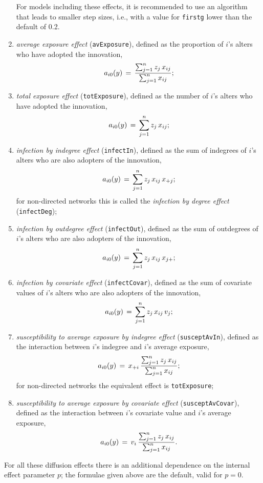 \documentclass[a4paper,fleqn,11pt]{article}
\newcommand{\+}{\, + \,}
\newcommand{\vit}{\theenumi}
\begin{document}
\begin{enumerate}
 For models including these effects, it is recommended to use
 an algorithm that leads to smaller step sizes, i.e.,
 with a value for \texttt{firstg} lower than the default of 0.2.

\item \emph{average exposure effect} (\verb|avExposure|),
  defined as the proportion of $i$'s alters who have adopted the innovation,
\[
a_{i\vit}(y) \, = \, \frac{\sum_{j=1}^n z_j\, x_{ij} }{\sum_{j=1}^n x_{ij}};
\]

\item \emph{total exposure effect} (\verb|totExposure|), defined as the
 number of $i$'s alters who have adopted the innovation,
\[
a_{i\vit}(y) \,=\, \sum_{j=1}^n z_j\, x_{ij} ;
\]
\item \emph{infection by indegree effect} (\verb|infectIn|),
  defined as the sum of indegrees of $i$'s alters who are also adopters of the innovation,
\[
a_{i\vit}(y) \, =\, \sum_{j=1}^n z_j \,x_{ij}\, x_{+j};
\]
  for non-directed networks this is called the
   \emph{infection by degree effect} (\verb|infectDeg|);
\item \emph{infection by outdegree effect} (\verb|infectOut|),
 defined as the sum of outdegrees of $i$'s alters who are also adopters of the innovation,
\[
a_{i\vit}(y)\, = \, \sum_{j=1}^n z_j\, x_{ij}\, x_{j+};
\]
\item \emph{infection by covariate effect} (\verb|infectCovar|),
 defined as the sum of covariate values of $i$'s alters who are also adopters of the innovation,
\[
a_{i\vit}(y)\, =\, \sum_{j=1}^n z_j\, x_{ij}\, v_j;
\]
\item \emph{susceptibility to average exposure by indegree effect}
 (\verb|susceptAvIn|),
 defined as the interaction between $i$'s indegree and $i$'s average exposure,
\[
a_{i\vit}(y)\, = \,x_{+i} \, \frac{\sum_{j=1}^n z_j\, x_{ij}}{\sum_{j=1}^n x_{ij}};
\]
  for non-directed networks the equivalent effect is \verb|totExposure|;

\item \emph{susceptibility to average exposure by covariate effect}
 (\verb|susceptAvCovar|),
  defined as the interaction between $i$'s covariate value and $i$'s  average exposure,
\[
a_{i\vit}(y) \, = \, v_{i} \, \frac{\sum_{j=1}^n z_j\, x_{ij}}{\sum_{j=1}^n x_{ij}}.
\]

\end{enumerate}

For all  these diffusion effects there is an additional dependence
on the internal effect parameter $p$; the formulae given above are the default,
valid for $p=0$.
\end{document}
